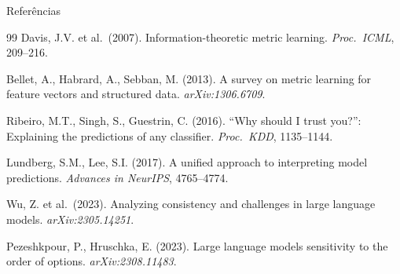 \documentclass[aspectratio=169, 8pt]{beamer}
\begin{document}
\begin{frame}[allowframebreaks]{Referências}
\begin{thebibliography}{99}
    Davis, J.V. et al.\ (2007).
    Information-theoretic metric learning.
    \textit{Proc.\ ICML}, 209--216.

    Bellet, A., Habrard, A., Sebban, M. (2013).
    A survey on metric learning for feature vectors and structured data.
    \textit{arXiv:1306.6709}.

    Ribeiro, M.T., Singh, S., Guestrin, C. (2016).
    ``Why should I trust you?'': Explaining the predictions of any classifier.
    \textit{Proc.\ KDD}, 1135--1144.

    Lundberg, S.M., Lee, S.I. (2017).
    A unified approach to interpreting model predictions.
    \textit{Advances in NeurIPS}, 4765--4774.

    Wu, Z. et al.\ (2023).
    Analyzing consistency and challenges in large language models.
    \textit{arXiv:2305.14251}.

    Pezeshkpour, P., Hruschka, E. (2023).
    Large language models sensitivity to the order of options.
    \textit{arXiv:2308.11483}.

  \end{thebibliography}
\end{frame}


\appendix
\end{document}
